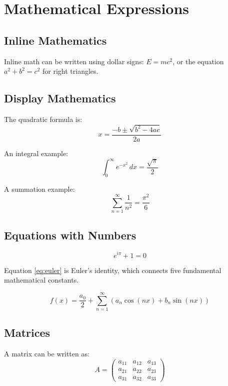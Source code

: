 \documentclass[12pt,a4paper]{article}
\begin{document}
\section{Mathematical Expressions}

\subsection{Inline Mathematics}

Inline math can be written using dollar signs: $E = mc^2$, or the equation $a^2 + b^2 = c^2$ for right triangles.

\subsection{Display Mathematics}

The quadratic formula is:
\[
x = \frac{-b \pm \sqrt{b^2 - 4ac}}{2a}
\]

An integral example:
\[
\int_{0}^{\infty} e^{-x^2} \, dx = \frac{\sqrt{\pi}}{2}
\]

A summation example:
\[
\sum_{n=1}^{\infty} \frac{1}{n^2} = \frac{\pi^2}{6}
\]

\subsection{Equations with Numbers}

\begin{equation}
\label{eq:euler}
e^{i\pi} + 1 = 0
\end{equation}

Equation \ref{eq:euler} is Euler's identity, which connects five fundamental mathematical constants.

\begin{equation}
\label{eq:fourier}
f(x) = \frac{a_0}{2} + \sum_{n=1}^{\infty} \left( a_n \cos(nx) + b_n \sin(nx) \right)
\end{equation}

\subsection{Matrices}

A matrix can be written as:
\[
A = \begin{pmatrix}
a_{11} & a_{12} & a_{13} \\
a_{21} & a_{22} & a_{23} \\
a_{31} & a_{32} & a_{33}
\end{pmatrix}
\]
\end{document}

